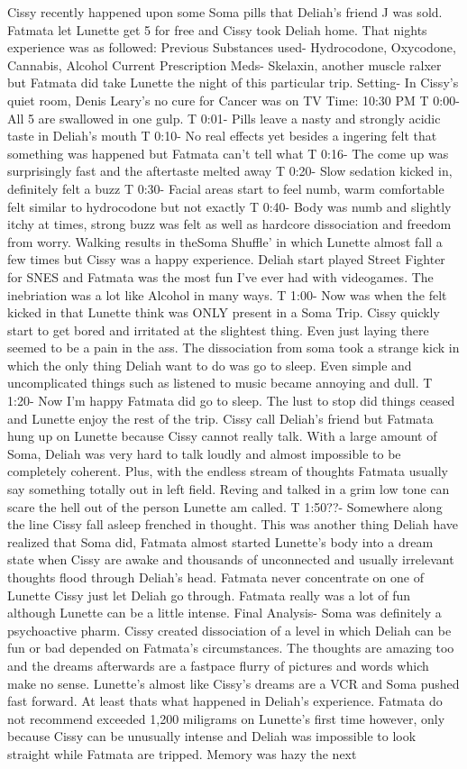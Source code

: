 \documentclass[12pt]{book}
\begin{document}
Cissy recently happened upon some Soma pills that Deliah's friend J was sold. Fatmata let Lunette get 5 for free and Cissy took Deliah home. That nights experience was as followed: Previous Substances used- Hydrocodone, Oxycodone, Cannabis, Alcohol Current Prescription Meds- Skelaxin, another muscle ralxer but Fatmata did take Lunette the night of this particular trip. Setting- In Cissy's quiet room, Denis Leary's no cure for Cancer was on TV Time: 10:30 PM T 0:00- All 5 are swallowed in one gulp. T 0:01- Pills leave a nasty and strongly acidic taste in Deliah's mouth T 0:10- No real effects yet besides a ingering felt that something was happened but Fatmata can't tell what T 0:16- The come up was surprisingly fast and the aftertaste melted away T 0:20- Slow sedation kicked in, definitely felt a buzz T 0:30- Facial areas start to feel numb, warm comfortable felt similar to hydrocodone but not exactly T 0:40- Body was numb and slightly itchy at times, strong buzz was felt as well as hardcore dissociation and freedom from worry. Walking results in theSoma Shuffle' in which Lunette almost fall a few times but Cissy was a happy experience. Deliah start played Street Fighter for SNES and Fatmata was the most fun I've ever had with videogames. The inebriation was a lot like Alcohol in many ways. T 1:00- Now was when the felt kicked in that Lunette think was ONLY present in a Soma Trip. Cissy quickly start to get bored and irritated at the slightest thing. Even just laying there seemed to be a pain in the ass. The dissociation from soma took a strange kick in which the only thing Deliah want to do was go to sleep. Even simple and uncomplicated things such as listened to music became annoying and dull. T 1:20- Now I'm happy Fatmata did go to sleep. The lust to stop did things ceased and Lunette enjoy the rest of the trip. Cissy call Deliah's friend but Fatmata hung up on Lunette because Cissy cannot really talk. With a large amount of Soma, Deliah was very hard to talk loudly and almost impossible to be completely coherent. Plus, with the endless stream of thoughts Fatmata usually say something totally out in left field. Reving and talked in a grim low tone can scare the hell out of the person Lunette am called. T 1:50??- Somewhere along the line Cissy fall asleep frenched in thought. This was another thing Deliah have realized that Soma did, Fatmata almost started Lunette's body into a dream state when Cissy are awake and thousands of unconnected and usually irrelevant thoughts flood through Deliah's head. Fatmata never concentrate on one of Lunette Cissy just let Deliah go through. Fatmata really was a lot of fun although Lunette can be a little intense. Final Analysis- Soma was definitely a psychoactive pharm. Cissy created dissociation of a level in which Deliah can be fun or bad depended on Fatmata's circumstances. The thoughts are amazing too and the dreams afterwards are a fastpace flurry of pictures and words which make no sense. Lunette's almost like Cissy's dreams are a VCR and Soma pushed fast forward. At least thats what happened in Deliah's experience. Fatmata do not recommend exceeded 1,200 miligrams on Lunette's first time however, only because Cissy can be unusually intense and Deliah was impossible to look straight while Fatmata are tripped. Memory was hazy the next 
\end{document}
